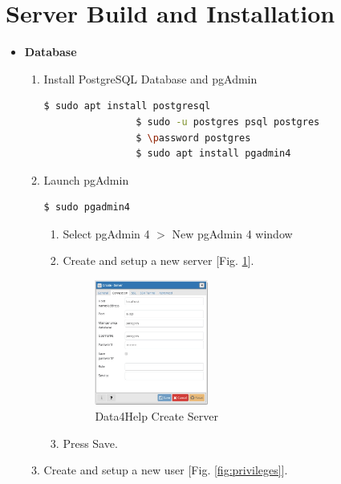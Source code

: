 \documentclass[a4paper, hidelinks, 12pt]{report}
\begin{document}
	\section{Server Build and Installation}
	
\begin{itemize}
	\item \textbf{Database}
		\begin{enumerate}
			\item Install PostgreSQL Database and pgAdmin
			\begin{lstlisting}[language=bash]
				$ sudo apt install postgresql
				$ sudo -u postgres psql postgres
				$ \password postgres
				$ sudo apt install pgadmin4
			\end{lstlisting}
			
			\item Launch pgAdmin 
			\begin{lstlisting}[language=bash]
				$ sudo pgadmin4
			\end{lstlisting}
			
			\begin{enumerate}
				\item Select pgAdmin 4 $>$ New pgAdmin 4 window
				\item Create and setup a new server  [Fig. \ref{fig:create_server}].
			
				\begin{figure}[H]
					\centering
				\includegraphics[width=0.4\textwidth]{images/create_server.jpeg}
					\caption[Data4Help Create Server]{Data4Help Create Server}
				\label{fig:create_server}
			\end{figure}
				
				\item Press Save.
			\end{enumerate}			
			
			\item Create and setup a new user [Fig. \ref{fig:privileges}].
			

\end{enumerate}
\end{itemize}
\end{document}
